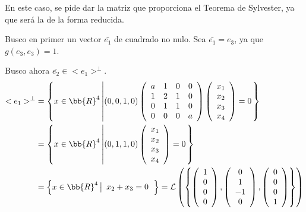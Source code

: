 \begin{ejercicio}
\begin{enumerate}
        En este caso, se pide dar la matriz que proporciona el Teorema de Sylvester, ya que será la de la forma reducida.

        Busco en primer un vector $\bar{e_1}$ de cuadrado no nulo. Sea $\bar{e_1}=e_3$, ya que $g(e_3,e_3) = 1$.

        Busco ahora $\bar{e_2} \in <e_1>^\perp$.
        \begin{equation*}\begin{split}
            <e_1>^\perp & = \left\{x\in \bb{R}^4 \left|
            (0, 0, 1, 0)\left( \begin{array}{cccc}
                a & 1 & 0 & 0 \\
                1 & 2 & 1 & 0 \\
                0 & 1 & 1 & 0 \\
                0 & 0 & 0 & a
            \end{array}\right)
            \left( \begin{array}{c}
                x_1 \\ x_2 \\ x_3 \\ x_4
            \end{array}\right)
            = 0
            \right.\right\}\\
            & = \left\{x\in \bb{R}^4 \left|
            (0, 1, 1, 0)
            \left( \begin{array}{c}
                x_1 \\ x_2 \\ x_3 \\ x_4
            \end{array}\right)
            = 0
            \right.\right\} \\
            &= \left\{x\in \bb{R}^4 \left|
            \begin{array}{c}
                x_2 + x_3 = 0
            \end{array}
            \right.\right\} = \mathcal{L} \left( \left\{
            \left( \begin{array}{c}
                1 \\ 0 \\ 0 \\ 0
            \end{array} \right),
            \left( \begin{array}{c}
                0 \\ 1 \\ -1 \\ 0
            \end{array} \right),
            \left( \begin{array}{c}
                0 \\ 0 \\ 0 \\ 1
            \end{array} \right)
            \right\}\right)
        \end{split}\end{equation*}


\end{enumerate}
\end{ejercicio}
